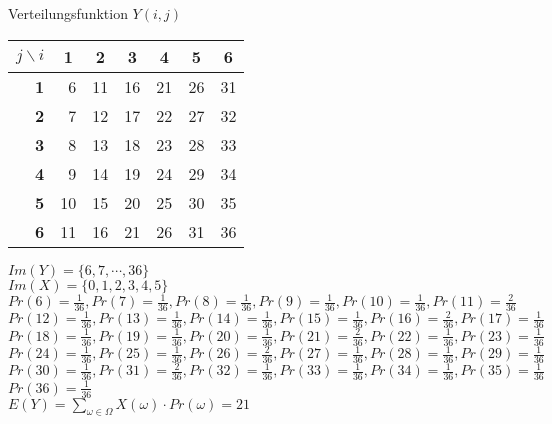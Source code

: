 \documentclass[a4paper]{scrartcl}
\begin{document}
\begin{flushleft}
		\begin{center}
		Verteilungsfunktion $Y(i,j)$\\
		\begin{tabular}{|r|r|r|r|r|r|r|}
		\hline
		\multicolumn{1}{|c|}{$j\backslash i$} & \multicolumn{1}{c|}{\textbf{1}} & \multicolumn{1}{c|}{\textbf{2}} & \multicolumn{1}{c|}{\textbf{3}} & \multicolumn{1}{c|}{\textbf{4}} & \multicolumn{1}{c|}{\textbf{5}} & \multicolumn{1}{c|}{\textbf{6}} \\ \hline
		\textbf{1} & 6  & 11 & 16 & 21 & 26 & 31 \\ \hline
		\textbf{2} & 7  & 12 & 17 & 22 & 27 & 32 \\ \hline
		\textbf{3} & 8  & 13 & 18 & 23 & 28 & 33 \\ \hline
		\textbf{4} & 9  & 14 & 19 & 24 & 29 & 34 \\ \hline
		\textbf{5} & 10 & 15 & 20 & 25 & 30 & 35 \\ \hline
		\textbf{6} & 11 & 16 & 21 & 26 & 31 & 36 \\ \hline
		\end{tabular}
		\end{center}
		$Im(Y)=\{6,7,\cdots,36\}$\\
		$Im(X)=\{0,1,2,3,4,5\}$\\
		$Pr(6) = \frac{1}{36}, Pr(7) = \frac{1}{36}, Pr(8) = \frac{1}{36}, Pr(9) = \frac{1}{36}, Pr(10) = \frac{1}{36}, Pr(11) = \frac{2}{36}$\\
		$Pr(12) = \frac{1}{36}, Pr(13) = \frac{1}{36}, Pr(14) = \frac{1}{36}, Pr(15) = \frac{1}{36}, Pr(16) = \frac{2}{36}, Pr(17) = \frac{1}{36}$\\
		$Pr(18) = \frac{1}{36}, Pr(19) = \frac{1}{36}, Pr(20) = \frac{1}{36}, Pr(21) = \frac{2}{36}, Pr(22) = \frac{1}{36}, Pr(23) = \frac{1}{36}$\\
		$Pr(24) = \frac{1}{36}, Pr(25) = \frac{1}{36}, Pr(26) = \frac{2}{36}, Pr(27) = \frac{1}{36}, Pr(28) = \frac{1}{36}, Pr(29) = \frac{1}{36}$\\
		$Pr(30) = \frac{1}{36}, Pr(31) = \frac{2}{36}, Pr(32) = \frac{1}{36}, Pr(33) = \frac{1}{36}, Pr(34) = \frac{1}{36}, Pr(35) = \frac{1}{36}$\\
		$Pr(36) = \frac{1}{36}$\\
		$E(Y)=\sum\limits_{\omega\in\Omega} X(\omega)\cdot Pr(\omega) = 21$\\[1em]


\end{flushleft}
\end{document}
